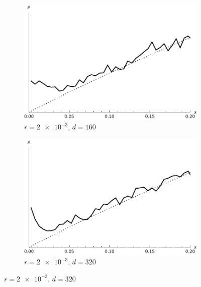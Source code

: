 \documentclass[a4paper,12pt,reqno,superscriptaddress,nofootinbib]{article}
\theoremstyle{plain}
\theoremstyle{definition}
\theoremstyle{remark}
\newcommand{\0}{^{(0)}}
\newcommand{\1}{^{(1)}}
\newcommand{\2}{^{(2)}}
\begin{document}
\begin{figure}
	\begin{subfigure}{0.48\textwidth}
		\includegraphics[width=\textwidth]{plot-r-2-d-4.pdf}
		\caption{$r=\num{2e-3}$, $d=160$}
	\end{subfigure}\hfill
	\begin{subfigure}{0.48\textwidth}
		\includegraphics[width=\textwidth]{plot-r-2-d-5.pdf}
		\caption{$r=\num{2e-3}$, $d=320$}
	\end{subfigure}
	

\end{figure}
\end{document}
